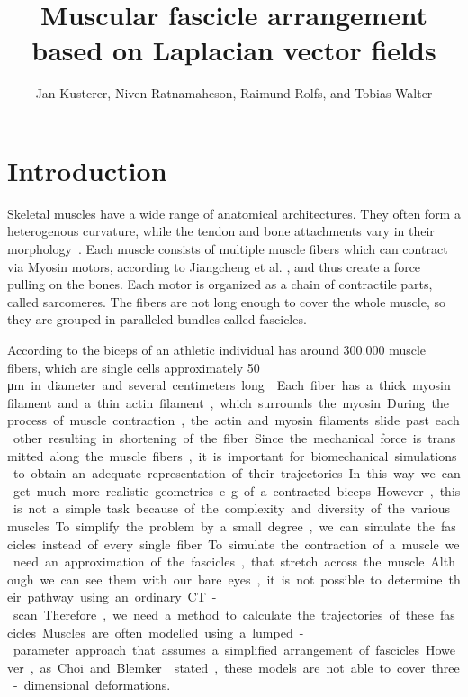 \documentclass[preprint,journal]{vgtc}       %
\title{Muscular fascicle arrangement based on Laplacian vector fields}
\author{Jan Kusterer, Niven Ratnamaheson, Raimund Rolfs, and Tobias Walter}
\begin{document}
\maketitle

\section{Introduction}\label{sec:intro}
Skeletal muscles have a wide range of anatomical architectures. They often form a heterogenous curvature, while the tendon and bone attachments vary in their morphology~\cite{Choi2013}. Each muscle consists of multiple muscle fibers which can contract via Myosin motors, according to Jiangcheng et al. \cite{Jiangcheng2015}, and thus create a force pulling on the bones. Each motor is organized as a chain of contractile parts, called sarcomeres. The fibers are not long enough to cover the whole muscle, so they are grouped in paralleled bundles called fascicles. 

According to \cite{Etemadi.et.Al.} the biceps of an athletic individual has around 300.000 muscle fibers, which are single cells approximately 50 \si\micro m in diameter and several centimeters long \cite{Cooper2000}. Each fiber has a thick myosin filament and a thin actin filament, which surrounds the myosin. During the process of muscle contraction, the actin and myosin filaments slide past each other resulting in shortening of the fiber.

Since the mechanical force is transmitted along the muscle fibers, it is important for biomechanical simulations to obtain an adequate representation of their trajectories. In this way we can get much more realistic geometries e.g. of a contracted biceps. However, this is not a simple task because of the complexity and diversity of the various muscles. To simplify the problem by a small degree, we can simulate the fascicles instead of every single fiber.

To simulate the contraction of a muscle we need an approximation of the fascicles, that stretch across the muscle. Although we can see them with our bare eyes, it is not possible to determine their pathway using an ordinary CT-scan. 
Therefore, we need a method to calculate the trajectories of these fascicles. Muscles are often modelled using a lumped-parameter approach that assumes a simplified arrangement of fascicles. However, as Choi and Blemker \cite{Choi2013} stated, these models are not able to cover three-dimensional deformations.
\end{document}
